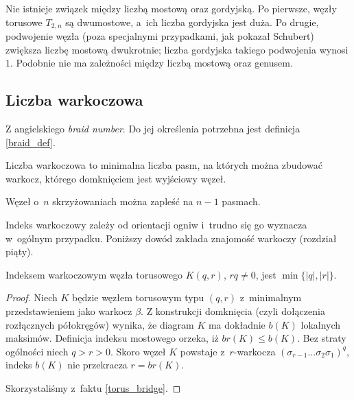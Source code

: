 Nie istnieje związek między liczbą mostową oraz gordyjską.
Po pierwsze, węzły torusowe $T_{2,n}$ są dwumostowe, a~ich liczba gordyjska jest duża.
Po drugie, podwojenie węzła (poza specjalnymi przypadkami, jak pokazał Schubert) zwiększa liczbę mostową dwukrotnie; liczba gordyjska takiego podwojenia wynosi $1$.
Podobnie nie ma zależności między liczbą mostową oraz genusem.


\subsection{Liczba warkoczowa} %
\label{sub:braid_number}
Z angielskiego \emph{braid number}.
Do jej określenia potrzebna jest definicja \ref{braid_def}.

\begin{definition}
    Liczba warkoczowa to minimalna liczba pasm, na których można zbudować warkocz, którego domknięciem jest wyjściowy węzeł.
\end{definition}

\begin{proposition}
    Węzeł o~$n$ skrzyżowaniach można zapleść na $n - 1$ pasmach.
\end{proposition}

Indeks warkoczowy zależy od orientacji ogniw i~trudno się go wyznacza w~ogólnym przypadku.
Poniższy dowód zakłada znajomość warkoczy (rozdział piąty).

\begin{proposition}
    Indeksem warkoczowym węzła torusowego $K(q, r)$, $rq \neq 0$, jest $\min\{|q|, |r|\}$.
\end{proposition}

\begin{proof}
    Niech $K$ będzie węzłem torusowym typu $(q,r)$ z~minimalnym przedstawieniem jako warkocz $\beta$.
    Z konstrukcji domknięcia (czyli dołączenia rozłącznych półokręgów) wynika,
    że diagram $K$ ma dokładnie $b(K)$ lokalnych maksimów.
    Definicja indeksu mostowego orzeka, iż $br(K) \le b(K)$.
    Bez straty ogólności niech $q > r > 0$.
    Skoro węzeł $K$ powstaje z~$r$-warkocza $(\sigma_{r-1} \ldots \sigma_2\sigma_1)^q$,
    indeks $b(K)$ nie przekracza $r = br(K)$.

    Skorzystaliśmy z~faktu \ref{torus_bridge}.
\end{proof}



